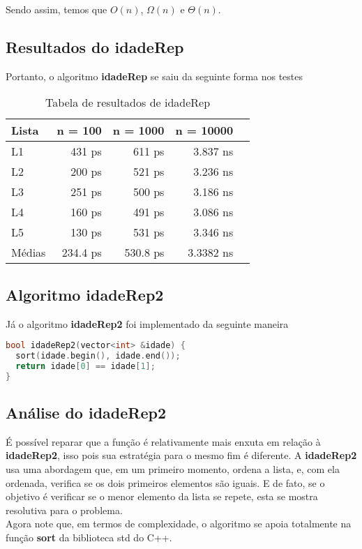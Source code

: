 Sendo assim, temos que $O(n)$, $\Omega(n)$ e $\Theta(n)$.

\subsection{Resultados do idadeRep}

Portanto, o algoritmo \textbf{idadeRep} se saiu da seguinte forma nos testes

\begin{table}[h!]
	\centering
	\caption{Tabela de resultados de idadeRep}
	\label{tab:idade_rep_result}
	\begin{tabular}{lrrrr}
		\toprule
		Lista   & n = 100   & n = 1000  & n = 10000 \\
		\midrule
		L1      & 431 ps    & 611 ps    & 3.837 ns  \\
		L2      & 200 ps    & 521 ps    & 3.236 ns  \\
		L3      & 251 ps    & 500 ps    & 3.186 ns  \\
		L4      & 160 ps    & 491 ps    & 3.086 ns  \\
		L5      & 130 ps    & 531 ps    & 3.346 ns  \\
		\midrule
		Médias  & 234.4 ps  & 530.8 ps  & 3.3382 ns \\
		\bottomrule
	\end{tabular}
\end{table}

\subsection{Algoritmo idadeRep2}

Já o algoritmo \textbf{idadeRep2} foi implementado da seguinte maneira 

\begin{lstlisting}[language=C++]
bool idadeRep2(vector<int> &idade) {
  sort(idade.begin(), idade.end());
  return idade[0] == idade[1];
}
\end{lstlisting}

\subsection{Análise do idadeRep2}

É possível reparar que a função é relativamente mais enxuta em relação à \textbf{idadeRep2}, isso pois sua estratégia para o mesmo fim é diferente. A \textbf{idadeRep2} usa uma abordagem que, em um primeiro momento, ordena a lista, e, com ela ordenada, verifica se os dois primeiros elementos são iguais. E de fato, se o objetivo é verificar se o menor elemento da lista se repete, esta se mostra resolutiva para o problema. \\
Agora note que, em termos de complexidade, o algoritmo se apoia totalmente na função \textbf{sort} da biblioteca std do C++.

